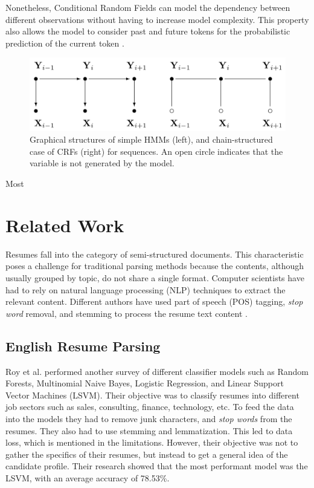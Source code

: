\documentclass[a4paper, conference]{ieeeconf}
\begin{document}
  Nonetheless, Conditional Random Fields can model the dependency between
  different observations without having to increase model complexity. This
  property also allows the model to consider past and future tokens for the
  probabilistic prediction of the current token \cite{Lafferty2001}.
  \begin{figure}[h]
    \centering
    \includegraphics[width=\columnwidth]{hmm_vs_crf.png}
    \caption{%
      Graphical structures of simple HMMs (left), and chain-structured case of
      CRFs (right) for sequences. An open circle indicates that the variable is
      not generated by the model. \cite{Lafferty2001}
    }
  \end{figure}

  Most

  \section{Related Work} Resumes fall into the category of semi-structured
  documents. This characteristic poses a challenge for traditional parsing
  methods because the contents, although usually grouped by topic, do not share
  a single format. Computer scientists have had to rely on natural language
  processing (NLP) techniques to extract the relevant content. Different
  authors have used part of speech (POS) tagging, \textit{stop word} removal,
  and stemming to process the resume text content
  \cite{Sanyal2015,Ayishathahira2018a,Roy2020a}.

  \subsection{English Resume Parsing}
  Roy et al. \cite{Roy2020a} performed another survey of different classifier
  models such as Random Forests, Multinomial Naive Bayes, Logistic Regression,
  and Linear Support Vector Machines (LSVM). Their objective was to classify
  resumes into different job sectors such as sales, consulting, finance,
  technology, etc. To feed the data into the models they had to remove junk
  characters, and \textit{stop words} from the resumes. They also had to use
  stemming and lemmatization. This led to data loss, which is mentioned in the
  limitations. However, their objective was not to gather the specifics of
  their resumes, but instead to get a general idea of the candidate profile.
  Their research showed that the most performant model was the LSVM, with an
  average accuracy of 78.53\%.
\end{document}

